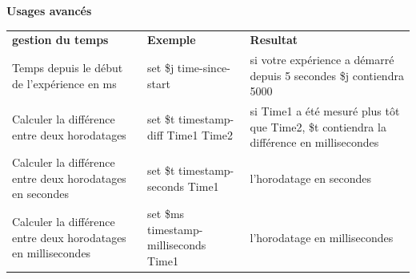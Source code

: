 \documentclass[
]{book}
\begin{document}
\textbf{Usages avancés}

\begin{longtable}[]{@{}lll@{}}
\toprule
\endhead
\begin{minipage}[t]{0.30\columnwidth}\raggedright
\textbf{gestion du temps}\strut
\end{minipage} & \begin{minipage}[t]{0.19\columnwidth}\raggedright
\textbf{Exemple}\strut
\end{minipage} & \begin{minipage}[t]{0.42\columnwidth}\raggedright
\textbf{Resultat}\strut
\end{minipage}\tabularnewline
\begin{minipage}[t]{0.30\columnwidth}\raggedright
Temps depuis le début de l'expérience en ms\strut
\end{minipage} & \begin{minipage}[t]{0.19\columnwidth}\raggedright
set \$j time-since-start\strut
\end{minipage} & \begin{minipage}[t]{0.42\columnwidth}\raggedright
si votre expérience a démarré depuis 5 secondes \$j contiendra
5000\strut
\end{minipage}\tabularnewline
\begin{minipage}[t]{0.30\columnwidth}\raggedright
Calculer la différence entre deux horodatages\strut
\end{minipage} & \begin{minipage}[t]{0.19\columnwidth}\raggedright
set \$t timestamp-diff Time1 Time2\strut
\end{minipage} & \begin{minipage}[t]{0.42\columnwidth}\raggedright
si Time1 a été mesuré plus tôt que Time2, \$t contiendra la différence
en millisecondes\strut
\end{minipage}\tabularnewline
\begin{minipage}[t]{0.30\columnwidth}\raggedright
Calculer la différence entre deux horodatages en secondes\strut
\end{minipage} & \begin{minipage}[t]{0.19\columnwidth}\raggedright
set \$t timestamp-seconds Time1\strut
\end{minipage} & \begin{minipage}[t]{0.42\columnwidth}\raggedright
l'horodatage en secondes\strut
\end{minipage}\tabularnewline
\begin{minipage}[t]{0.30\columnwidth}\raggedright
Calculer la différence entre deux horodatages en millisecondes\strut
\end{minipage} & \begin{minipage}[t]{0.19\columnwidth}\raggedright
set \$ms timestamp-milliseconds Time1\strut
\end{minipage} & \begin{minipage}[t]{0.42\columnwidth}\raggedright
l'horodatage en millisecondes\strut
\end{minipage}\tabularnewline
\bottomrule
\end{longtable}
\end{document}
